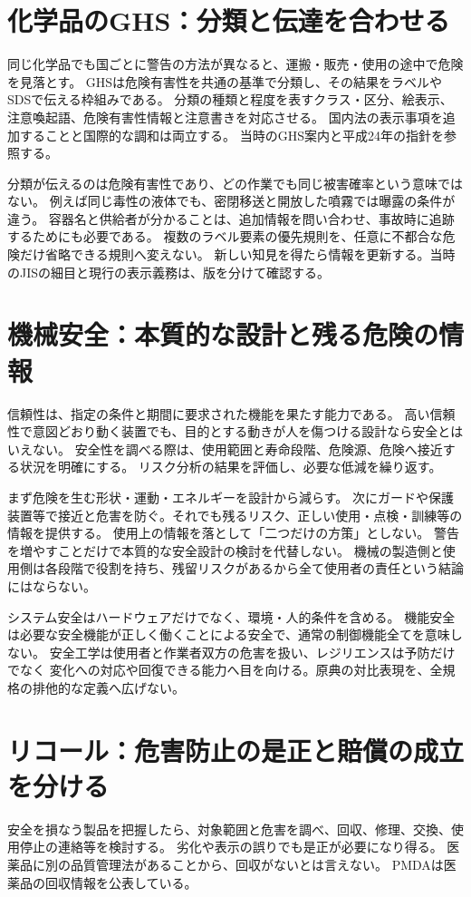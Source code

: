 \section{化学品のGHS：分類と伝達を合わせる}
\label{theory:safety:ghs}
同じ化学品でも国ごとに警告の方法が異なると、運搬・販売・使用の途中で危険を見落とす。
GHSは危険有害性を共通の基準で分類し、その結果をラベルやSDSで伝える枠組みである。
分類の種類と程度を表すクラス・区分、絵表示、注意喚起語、危険有害性情報と注意書きを対応させる。
国内法の表示事項を追加することと国際的な調和は両立する。
当時のGHS案内と平成24年の指針を参照する。\cite{saf53_ghs_old,saf53_ghs_notice}

分類が伝えるのは危険有害性であり、どの作業でも同じ被害確率という意味ではない。
例えば同じ毒性の液体でも、密閉移送と開放した噴霧では曝露の条件が違う。
容器名と供給者が分かることは、追加情報を問い合わせ、事故時に追跡するためにも必要である。
複数のラベル要素の優先規則を、任意に不都合な危険だけ省略できる規則へ変えない。
新しい知見を得たら情報を更新する。当時のJISの細目と現行の表示義務は、版を分けて確認する。

\section{機械安全：本質的な設計と残る危険の情報}
\label{theory:safety:machine}
信頼性は、指定の条件と期間に要求された機能を果たす能力である。
高い信頼性で意図どおり動く装置でも、目的とする動きが人を傷つける設計なら安全とはいえない。
安全性を調べる際は、使用範囲と寿命段階、危険源、危険へ接近する状況を明確にする。
リスク分析の結果を評価し、必要な低減を繰り返す。\cite{saf53_machine2007}

まず危険を生む形状・運動・エネルギーを設計から減らす。
次にガードや保護装置等で接近と危害を防ぐ。それでも残るリスク、正しい使用・点検・訓練等の情報を提供する。
使用上の情報を落として「二つだけの方策」としない。
警告を増やすことだけで本質的な安全設計の検討を代替しない。
機械の製造側と使用側は各段階で役割を持ち、残留リスクがあるから全て使用者の責任という結論にはならない。

システム安全はハードウェアだけでなく、環境・人的条件を含める。
機能安全は必要な安全機能が正しく働くことによる安全で、通常の制御機能全てを意味しない。
安全工学は使用者と作業者双方の危害を扱い、レジリエンスは予防だけでなく
変化への対応や回復できる能力へ目を向ける。原典の対比表現を、全規格の排他的な定義へ広げない。

\section{リコール：危害防止の是正と賠償の成立を分ける}
\label{theory:safety:recall}
安全を損なう製品を把握したら、対象範囲と危害を調べ、回収、修理、交換、使用停止の連絡等を検討する。
劣化や表示の誤りでも是正が必要になり得る。
医薬品に別の品質管理法があることから、回収がないとは言えない。
PMDAは医薬品の回収情報を公表している。\cite{saf53_medicine_recall}

